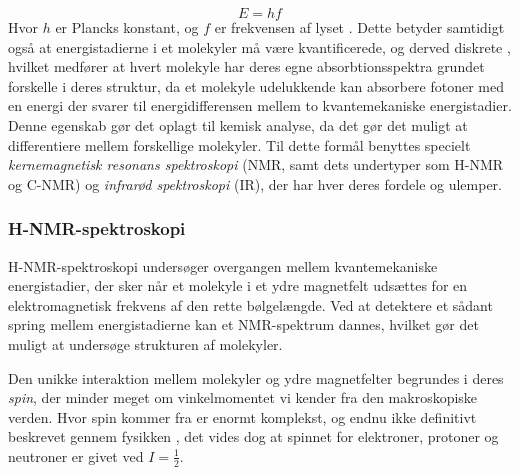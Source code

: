    \[
    E=hf
    \]
    Hvor $h$ er Plancks konstant, og $f$ er frekvensen af lyset \parencite{Giov2022}. Dette betyder samtidigt også at energistadierne i et molekyler må være kvantificerede, og derved diskrete \parencite{Erla2002}, hvilket medfører at hvert molekyle har deres egne absorbtionsspektra grundet forskelle i deres struktur, da et molekyle udelukkende kan absorbere fotoner med en energi der svarer til energidifferensen mellem to kvantemekaniske energistadier. Denne egenskab gør det oplagt til kemisk analyse, da det gør det muligt at differentiere mellem forskellige molekyler. Til dette formål benyttes specielt \textit{kernemagnetisk resonans spektroskopi} (NMR, samt dets undertyper som H-NMR og C-NMR) og \textit{infrarød spektroskopi} (IR), der har hver deres fordele og ulemper. 

    \subsubsection{H-NMR-spektroskopi}
    H-NMR-spektroskopi undersøger overgangen mellem kvantemekaniske energistadier, der sker når et molekyle i et ydre magnetfelt udsættes for en elektromagnetisk frekvens af den rette bølgelængde. Ved at detektere et sådant spring mellem energistadierne kan et NMR-spektrum dannes, hvilket gør det muligt at undersøge strukturen af molekyler.

    Den unikke interaktion mellem molekyler og ydre magnetfelter begrundes i deres \textit{spin}, der minder meget om vinkelmomentet vi kender fra den makroskopiske verden. Hvor spin kommer fra er enormt komplekst, og endnu ikke definitivt beskrevet gennem fysikken \parencite{Edwi2015}, det vides dog at spinnet for elektroner, protoner og neutroner er givet ved $I=\frac{1}{2}$.

